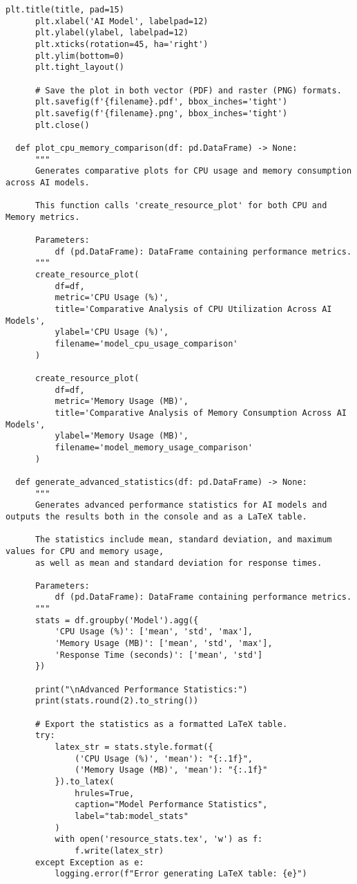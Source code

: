 \begin{lstlisting}[style=Python, caption={Python-quantitative-data-analysis}, captionpos=b]
      plt.title(title, pad=15)
      plt.xlabel('AI Model', labelpad=12)
      plt.ylabel(ylabel, labelpad=12)
      plt.xticks(rotation=45, ha='right')
      plt.ylim(bottom=0)
      plt.tight_layout()
      
      # Save the plot in both vector (PDF) and raster (PNG) formats.
      plt.savefig(f'{filename}.pdf', bbox_inches='tight')
      plt.savefig(f'{filename}.png', bbox_inches='tight')
      plt.close()
  
  def plot_cpu_memory_comparison(df: pd.DataFrame) -> None:
      """
      Generates comparative plots for CPU usage and memory consumption across AI models.
      
      This function calls 'create_resource_plot' for both CPU and Memory metrics.
      
      Parameters:
          df (pd.DataFrame): DataFrame containing performance metrics.
      """
      create_resource_plot(
          df=df,
          metric='CPU Usage (%)',
          title='Comparative Analysis of CPU Utilization Across AI Models',
          ylabel='CPU Usage (%)',
          filename='model_cpu_usage_comparison'
      )
      
      create_resource_plot(
          df=df,
          metric='Memory Usage (MB)',
          title='Comparative Analysis of Memory Consumption Across AI Models',
          ylabel='Memory Usage (MB)',
          filename='model_memory_usage_comparison'
      )
  
  def generate_advanced_statistics(df: pd.DataFrame) -> None:
      """
      Generates advanced performance statistics for AI models and outputs the results both in the console and as a LaTeX table.
      
      The statistics include mean, standard deviation, and maximum values for CPU and memory usage,
      as well as mean and standard deviation for response times.
      
      Parameters:
          df (pd.DataFrame): DataFrame containing performance metrics.
      """
      stats = df.groupby('Model').agg({
          'CPU Usage (%)': ['mean', 'std', 'max'],
          'Memory Usage (MB)': ['mean', 'std', 'max'],
          'Response Time (seconds)': ['mean', 'std']
      })
      
      print("\nAdvanced Performance Statistics:")
      print(stats.round(2).to_string())
      
      # Export the statistics as a formatted LaTeX table.
      try:
          latex_str = stats.style.format({
              ('CPU Usage (%)', 'mean'): "{:.1f}",
              ('Memory Usage (MB)', 'mean'): "{:.1f}"
          }).to_latex(
              hrules=True,
              caption="Model Performance Statistics",
              label="tab:model_stats"
          )
          with open('resource_stats.tex', 'w') as f:
              f.write(latex_str)
      except Exception as e:
          logging.error(f"Error generating LaTeX table: {e}")
  

\end{lstlisting}
